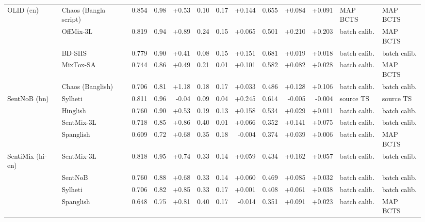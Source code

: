 \begin{table}[t]
{\begin{tabular}{llrrrrrrrrrll}
\midrule
OLID (en) & Chaos (Bangla script) & 0.854 & 0.98 & +0.53 & 0.10 & 0.17 & +0.144 & 0.655 & +0.084 & +0.091 & MAP BCTS & MAP BCTS \\
 & OffMix-3L & 0.819 & 0.94 & +0.89 & 0.24 & 0.15 & +0.065 & 0.501 & +0.210 & +0.203 & batch calib. & MAP BCTS \\
 & BD-SHS & 0.779 & 0.90 & +0.41 & 0.08 & 0.15 & +0.151 & 0.681 & +0.019 & +0.018 & batch calib. & batch calib. \\
 & MixTox-SA & 0.744 & 0.86 & +0.49 & 0.21 & 0.01 & +0.101 & 0.582 & +0.082 & +0.028 & batch calib. & MAP BCTS \\
 & Chaos (Banglish) & 0.706 & 0.81 & +1.18 & 0.18 & 0.17 & +0.033 & 0.486 & +0.128 & +0.106 & batch calib. & batch calib. \\
\midrule
SentNoB (bn) & Sylheti & 0.811 & 0.96 & -0.04 & 0.09 & 0.04 & +0.245 & 0.614 & -0.005 & -0.004 & source TS & source TS \\
 & Hinglish & 0.760 & 0.90 & +0.53 & 0.19 & 0.13 & +0.158 & 0.534 & +0.029 & +0.011 & batch calib. & batch calib. \\
 & SentMix-3L & 0.718 & 0.85 & +0.86 & 0.40 & 0.01 & +0.066 & 0.352 & +0.141 & +0.075 & batch calib. & batch calib. \\
 & Spanglish & 0.609 & 0.72 & +0.68 & 0.35 & 0.18 & -0.004 & 0.374 & +0.039 & +0.006 & batch calib. & MAP BCTS \\
\midrule
SentiMix (hi-en) & SentMix-3L & 0.818 & 0.95 & +0.74 & 0.33 & 0.14 & +0.059 & 0.434 & +0.162 & +0.057 & batch calib. & batch calib. \\
 & SentNoB & 0.760 & 0.88 & +0.68 & 0.33 & 0.14 & +0.060 & 0.469 & +0.085 & +0.032 & batch calib. & batch calib. \\
 & Sylheti & 0.706 & 0.82 & +0.85 & 0.33 & 0.17 & +0.001 & 0.408 & +0.061 & +0.038 & batch calib. & batch calib. \\
 & Spanglish & 0.648 & 0.75 & +0.81 & 0.40 & 0.17 & -0.014 & 0.351 & +0.091 & +0.023 & batch calib. & MAP BCTS \\
\bottomrule
\end{tabular}
}
\end{table}
